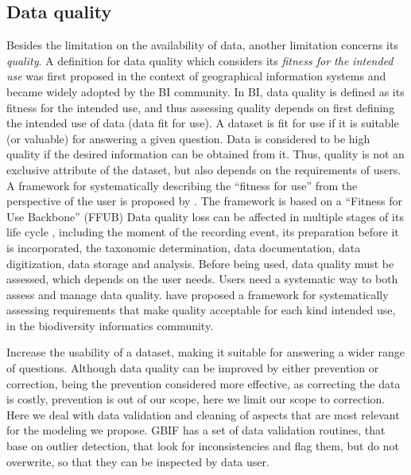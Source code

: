 







\subsection{Data quality}
Besides the limitation on the availability of data, another limitation concerns its \textit{quality}.
A definition for data quality which considers its \textit{fitness for the intended use} was first proposed in the context of geographical information systems \cite{Chrisman1984} and became widely adopted by the BI community.
In BI, data quality is defined as its fitness for the intended use, and thus assessing quality depends on first defining the intended use of data (data fit for use).
A dataset is fit for use if it is suitable (or valuable) for answering a given question.
Data is considered to be high quality if the desired information can be obtained from it.
Thus, quality is not an exclusive attribute of the dataset, but also depends on the requirements of users.
%
A framework for systematically describing the ``fitness for use'' from the perspective of the user is proposed by \cite{KochVeiga2017}. 
The framework is based on a ``Fitness for Use Backbone'' (FFUB)
%
%
Data quality loss can be affected in multiple stages of its life cycle \cite{Chapman2005}, including the moment of the recording event, its preparation before it is incorporated, the taxonomic determination, data documentation, data digitization, data storage and analysis.
%
Before being used, data quality must be assessed, which depends on the user needs.
Users need a systematic way to both assess and manage data quality.
 have proposed a framework for systematically assessing requirements that make quality acceptable for each kind intended use, in the biodiversity informatics community.


Increase the usability of a dataset, making it suitable for answering a wider range of questions.
Although data quality can be improved by either prevention or correction, being the prevention considered more effective, as correcting the data is costly\cite{Chapman2005}, prevention is out of our scope, here we limit our scope to correction.
Here we deal with data validation and cleaning of aspects that are most relevant for the modeling we propose.
GBIF has a set of data validation routines, that base on outlier detection, that look for inconsistencies and flag them, but do not overwrite, so that they can be inspected by data user.

